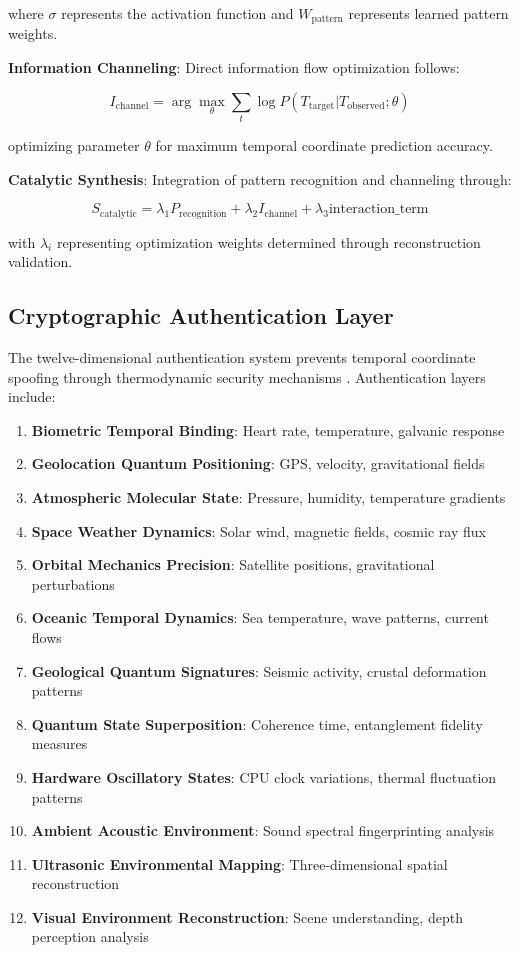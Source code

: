 \documentclass[11pt]{article}
\theoremstyle{remark}
\begin{document}
where $\sigma$ represents the activation function and $W_{\text{pattern}}$ represents learned pattern weights.

\textbf{Information Channeling}: Direct information flow optimization follows:

$$I_{\text{channel}} = \arg\max_\theta \sum_t \log P(T_{\text{target}}|T_{\text{observed}}; \theta)$$

optimizing parameter $\theta$ for maximum temporal coordinate prediction accuracy.

\textbf{Catalytic Synthesis}: Integration of pattern recognition and channeling through:

$$S_{\text{catalytic}} = \lambda_1 P_{\text{recognition}} + \lambda_2 I_{\text{channel}} + \lambda_3 \text{interaction\_term}$$

with $\lambda_i$ representing optimization weights determined through reconstruction validation.

\subsection{Cryptographic Authentication Layer}

The twelve-dimensional authentication system prevents temporal coordinate spoofing through thermodynamic security mechanisms \cite{sachikonye2024cryptographic}. Authentication layers include:

\begin{enumerate}
\item \textbf{Biometric Temporal Binding}: Heart rate, temperature, galvanic response
\item \textbf{Geolocation Quantum Positioning}: GPS, velocity, gravitational fields
\item \textbf{Atmospheric Molecular State}: Pressure, humidity, temperature gradients
\item \textbf{Space Weather Dynamics}: Solar wind, magnetic fields, cosmic ray flux
\item \textbf{Orbital Mechanics Precision}: Satellite positions, gravitational perturbations
\item \textbf{Oceanic Temporal Dynamics}: Sea temperature, wave patterns, current flows
\item \textbf{Geological Quantum Signatures}: Seismic activity, crustal deformation patterns
\item \textbf{Quantum State Superposition}: Coherence time, entanglement fidelity measures
\item \textbf{Hardware Oscillatory States}: CPU clock variations, thermal fluctuation patterns
\item \textbf{Ambient Acoustic Environment}: Sound spectral fingerprinting analysis
\item \textbf{Ultrasonic Environmental Mapping}: Three-dimensional spatial reconstruction
\item \textbf{Visual Environment Reconstruction}: Scene understanding, depth perception analysis
\end{enumerate}
\end{document}
